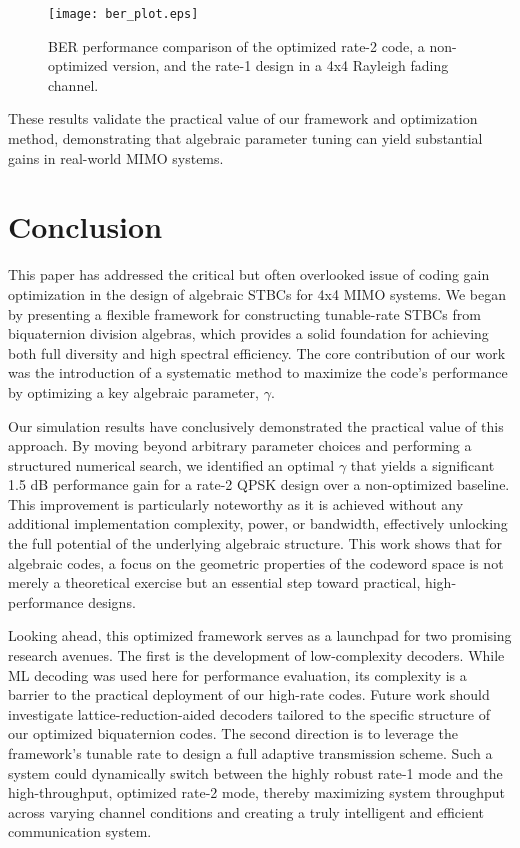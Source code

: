 \documentclass[twocolumn,conference]{IEEEtran}
\begin{document}
\begin{figure}[!t]
\centering
\texttt{[image: ber\_plot.eps]} 
\caption{BER performance comparison of the optimized rate-2 code, a non-optimized version, and the rate-1 design in a 4x4 Rayleigh fading channel.}
\label{fig:ber_plot}
\end{figure}

These results validate the practical value of our framework and optimization method, demonstrating that algebraic parameter tuning can yield substantial gains in real-world MIMO systems.


\section{Conclusion}
This paper has addressed the critical but often overlooked issue of coding gain optimization in the design of algebraic STBCs for 4x4 MIMO systems. We began by presenting a flexible framework for constructing tunable-rate STBCs from biquaternion division algebras, which provides a solid foundation for achieving both full diversity and high spectral efficiency. The core contribution of our work was the introduction of a systematic method to maximize the code's performance by optimizing a key algebraic parameter, \(\gamma\).

Our simulation results have conclusively demonstrated the practical value of this approach. By moving beyond arbitrary parameter choices and performing a structured numerical search, we identified an optimal \(\gamma\) that yields a significant 1.5 dB performance gain for a rate-2 QPSK design over a non-optimized baseline. This improvement is particularly noteworthy as it is achieved without any additional implementation complexity, power, or bandwidth, effectively unlocking the full potential of the underlying algebraic structure. This work shows that for algebraic codes, a focus on the geometric properties of the codeword space is not merely a theoretical exercise but an essential step toward practical, high-performance designs.

Looking ahead, this optimized framework serves as a launchpad for two promising research avenues. The first is the development of low-complexity decoders. While ML decoding was used here for performance evaluation, its complexity is a barrier to the practical deployment of our high-rate codes. Future work should investigate lattice-reduction-aided decoders tailored to the specific structure of our optimized biquaternion codes. The second direction is to leverage the framework's tunable rate to design a full adaptive transmission scheme. Such a system could dynamically switch between the highly robust rate-1 mode and the high-throughput, optimized rate-2 mode, thereby maximizing system throughput across varying channel conditions and creating a truly intelligent and efficient communication system.
\end{document}

